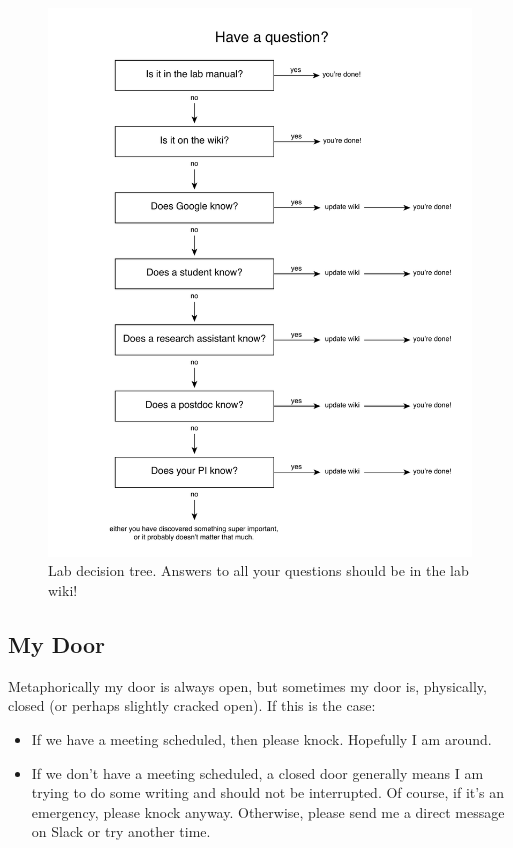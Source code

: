 \documentclass[letterpaper,11pt,oneside]{memoir}
\begin{document}
\begin{figure}
\label{fig:decisiontree}
\includegraphics[width=\textwidth]{figures/lab_decision_tree.pdf}
\caption{Lab decision tree. Answers to all your questions should be in the lab wiki!}
\end{figure}

\subsection{My Door}
Metaphorically my door is always open, but sometimes my door is, physically, closed (or perhaps slightly cracked open). If this is the case:

\begin{itemize}
\item If we have a meeting scheduled, then please knock. Hopefully I am around.
\item If we don't have a meeting scheduled, a closed door generally means I am trying to do some writing and should not be interrupted. Of course, if it's an emergency, please knock anyway. Otherwise, please send me a direct message on Slack or try another time.
\end{itemize}
\end{document}

